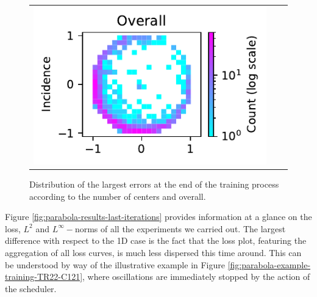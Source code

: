 \documentclass[12pt]{report} %
\begin{document}
\begin{figure}[h]
\begin{tabular}{ccc}
    \includegraphics[width=.4\textwidth]{imagenes/experiments/2d/statistical_2d_full_scheduler_interpolation/parabola/distribution_of_errors_L_inf_end.pdf}
  \end{tabular}
  \caption{Distribution of the largest errors at the end of the training process according to the number of centers and overall.}
  \label{fig:parabola-results-largest-errors}
\end{figure}

Figure \ref{fig:parabola-results-last-iterations} provides information at a glance on the loss, $L^2$ and $L^\infty-$norms of all the experiments we carried out. The largest difference with respect to the 1D case is the fact that the loss plot, featuring the aggregation of all loss curves, is much less dispersed this time around. This can be understood by way of the illustrative example in Figure \ref{fig:parabola-example-training-TR22-C121}, where oscillations are immediately stopped by the action of the scheduler.
\end{document}
